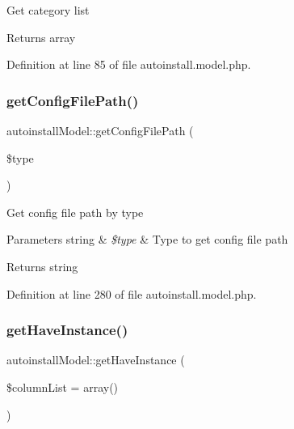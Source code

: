 Get category list

\begin{DoxyReturn}{Returns}
array 
\end{DoxyReturn}


Definition at line 85 of file autoinstall.\+model.\+php.

\hypertarget{classautoinstallModel_afc9baa56522814866589ebe952041a43}{}\label{classautoinstallModel_afc9baa56522814866589ebe952041a43} 
\subsubsection{\texorpdfstring{get\+Config\+File\+Path()}{getConfigFilePath()}}
{\footnotesize\ttfamily autoinstall\+Model\+::get\+Config\+File\+Path (\begin{DoxyParamCaption}\item[{}]{\$type }\end{DoxyParamCaption})}

Get config file path by type


\begin{DoxyParams}[1]{Parameters}
string & {\em \$type} & Type to get config file path \\
\hline
\end{DoxyParams}
\begin{DoxyReturn}{Returns}
string 
\end{DoxyReturn}


Definition at line 280 of file autoinstall.\+model.\+php.

\hypertarget{classautoinstallModel_ac2f036319c53b9a9392a7b4534fef4fd}{}\label{classautoinstallModel_ac2f036319c53b9a9392a7b4534fef4fd} 
\subsubsection{\texorpdfstring{get\+Have\+Instance()}{getHaveInstance()}}
{\footnotesize\ttfamily autoinstall\+Model\+::get\+Have\+Instance (\begin{DoxyParamCaption}\item[{}]{\$column\+List = {\ttfamily array()} }\end{DoxyParamCaption})}



